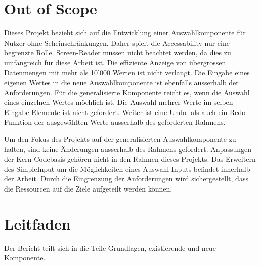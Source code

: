 \section{Out of Scope}

Dieses Projekt bezieht sich auf die Entwicklung einer Auswahlkomponente für Nutzer ohne Seheinschränkungen.
Daher spielt die Accessability nur eine begrenzte Rolle.
Screen-Reader müssen nicht beachtet werden, da dies zu umfangreich für diese Arbeit ist.
Die effiziente Anzeige von übergrossen Datenmengen mit mehr als 10'000 Werten ist nicht verlangt.
Die Eingabe eines eigenen Wertes in die neue Auswahlkomponente ist ebenfalls ausserhalb der Anforderungen.
Für die generalisierte Komponente reicht es, wenn die Auswahl eines einzelnen Wertes möchlich ist.
Die Auswahl mehrer Werte im selben Eingabe-Elemente ist nicht gefordert.
Weiter ist eine Undo- als auch ein Redo-Funktion der ausgewählten Werte ausserhalb des geforderten Rahmens. 

Um den Fokus des Projekts auf der generalisierten Auswahlkomponente zu halten, sind keine Änderungen ausserhalb des Rahmens gefordert.
Anpassungen der Kern-Codebasis gehören nicht in den Rahmen dieses Projekts.
Das Erweitern des SimpleInput um die Möglichkeiten eines Auswahl-Inputs befindet innerhalb der Arbeit.
Durch die Eingrenzung der Anforderungen wird sichergestellt, dass die Ressourcen auf die Ziele aufgeteilt werden können.


\section{Leitfaden}

Der Bericht teilt sich in die Teile Grundlagen, existierende und neue Komponente. 


